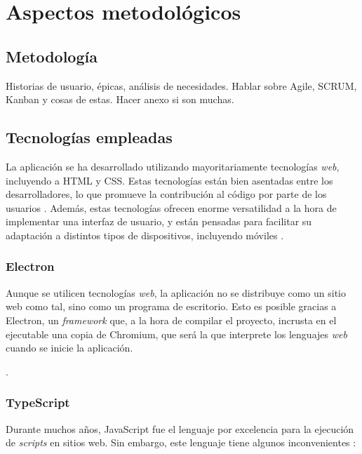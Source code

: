 \chapter{Aspectos metodológicos}  

\section{Metodología}

Historias de usuario, épicas, análisis de necesidades. Hablar sobre Agile, SCRUM, Kanban y cosas de estas.
Hacer anexo si son muchas.

\section{Tecnologías empleadas}

La aplicación se ha desarrollado utilizando mayoritariamente tecnologías \textit{web}, incluyendo a HTML y CSS. Estas tecnologías están bien asentadas entre los desarrolladores, lo que promueve la contribución al código por parte de los usuarios \autocite{7887704}. Además, estas tecnologías ofrecen enorme versatilidad a la hora de implementar una interfaz de usuario, y están pensadas para facilitar su adaptación a distintos tipos de dispositivos, incluyendo móviles \citationNeeded.

\subsection{Electron}

Aunque se utilicen tecnologías \textit{web}, la aplicación no se distribuye como un sitio web como tal, sino como un programa de escritorio. Esto es posible gracias a Electron, un \textit{framework} que, a la hora de compilar el proyecto, incrusta en el ejecutable una copia de Chromium, que será la que interprete los lenguajes \textit{web} cuando se inicie la aplicación. \autocite{Electron}

.

\subsection{TypeScript}

Durante muchos años, JavaScript fue el lenguaje por excelencia para la ejecución de \textit{scripts} en sitios web. Sin embargo, este lenguaje tiene algunos inconvenientes \autocite{10.1007/978-3-662-44202-9_11}:

